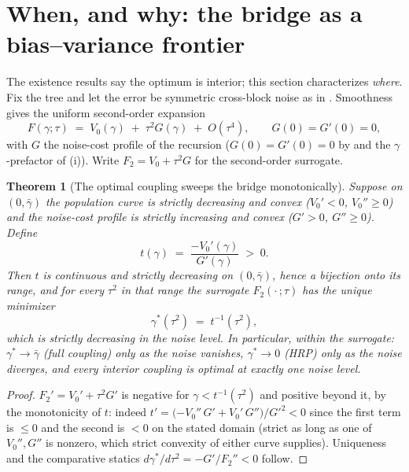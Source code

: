 \documentclass[11pt]{article}
\newtheorem{theorem}{Theorem}
\begin{document}
\section{When, and why: the bridge as a bias--variance frontier}
\label{sec:frontier}

The existence results say the optimum is interior; this section characterizes
\emph{where}. Fix the tree and let the error be symmetric cross-block noise as
in . Smoothness gives the uniform second-order expansion
\begin{equation}
  F(\gamma; \tau) \;=\; V_0(\gamma) \;+\; \tau^2 G(\gamma) \;+\; O(\tau^4),
  \qquad G(0) = G'(0) = 0,
  \label{eq:expansion}
\end{equation}
with $G$ the noise-cost profile of the recursion ($G(0) = G'(0) = 0$ by
 and the $\gamma$-prefactor of (i)). Write
$F_2 = V_0 + \tau^2 G$ for the second-order surrogate.

\begin{theorem}[The optimal coupling sweeps the bridge monotonically]
\label{thm:frontier}
Suppose on $(0, \bar\gamma)$ the population curve is strictly decreasing and
convex ($V_0' < 0$, $V_0'' \ge 0$) and the noise-cost profile is strictly
increasing and convex ($G' > 0$, $G'' \ge 0$). Define
\[
  t(\gamma) \;=\; \frac{-V_0'(\gamma)}{G'(\gamma)} \;>\; 0 .
\]
Then $t$ is continuous and strictly decreasing on $(0,\bar\gamma)$, hence a
bijection onto its range, and for every $\tau^2$ in that range the surrogate
$F_2(\cdot\,; \tau)$ has the unique minimizer
\[
  \gamma^*(\tau^2) \;=\; t^{-1}(\tau^2),
\]
which is strictly decreasing in the noise level. In particular, within the
surrogate: $\gamma^* \to \bar\gamma$ (full coupling) only as the noise
vanishes, $\gamma^* \to 0$ (HRP) only as the noise diverges, and \emph{every
interior coupling is optimal at exactly one noise level}.
\end{theorem}
\begin{proof}
$F_2' = V_0' + \tau^2 G'$ is negative for $\gamma < t^{-1}(\tau^2)$ and
positive beyond it, by the monotonicity of $t$: indeed
$t' = \big({-V_0''\, G'} + V_0'\, G''\big)/G'^2 < 0$ since the first term is
$\le 0$ and the second is $< 0$ on the stated domain (strict as long as one of
$V_0'', G''$ is nonzero, which strict convexity of either curve supplies).
Uniqueness and the comparative statics
$d\gamma^*/d\tau^2 = -G'/F_2'' < 0$ follow.
\end{proof}
\end{document}
